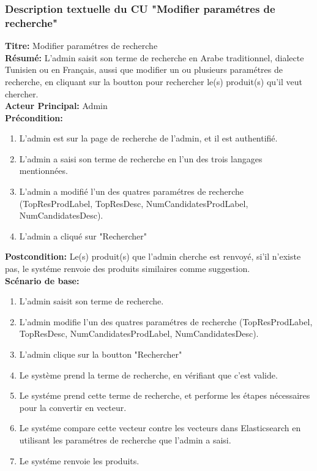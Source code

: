 \subsubsection{Description textuelle du CU "Modifier paramétres de recherche"}
\noindent
\textbf{Titre:} Modifier paramétres de recherche \\
\textbf{Résumé:} L'admin saisit son terme de recherche en Arabe traditionnel, dialecte Tunisien ou en Français, aussi que modifier un ou plusieurs paramétres de recherche, en cliquant sur la boutton pour rechercher le(s) produit(s) qu'il veut chercher. \\
\textbf{Acteur Principal:} Admin \\
\textbf{Précondition:} \begin{enumerate}
	\item L'admin est sur la page de recherche de l'admin, et il est authentifié.
	\item L'admin a saisi son terme de recherche en l'un des trois langages mentionnées.
	\item L'admin a modifié l'un des quatres paramétres de recherche (TopResProdLabel, TopResDesc, NumCandidatesProdLabel, NumCandidatesDesc).
	\item L'admin a cliqué sur "Rechercher"
\end{enumerate}
\textbf{Postcondition:} Le(s) produit(s) que l'admin cherche est renvoyé, si'il n'existe pas, le systéme renvoie des produits similaires comme suggestion. \\
\textbf{Scénario de base: }
\begin{enumerate}
	\item L'admin saisit son terme de recherche.
	\item L'admin modifie l'un des quatres paramétres de recherche (TopResProdLabel, TopResDesc, NumCandidatesProdLabel, NumCandidatesDesc).
	\item L'admin clique sur la boutton "Rechercher"
	\item Le système prend la terme de recherche, en vérifiant que c'est valide.
	\item Le systéme prend cette terme de recherche, et performe les étapes nécessaires pour la convertir en vecteur.
	\item Le systéme compare cette vecteur contre les vecteurs dans Elasticsearch en utilisant les paramétres de recherche que l'admin a saisi.
	\item Le systéme renvoie les produits.
\end{enumerate}

